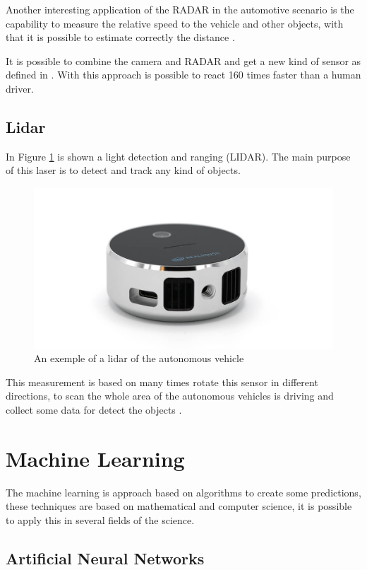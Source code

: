 Another interesting application of the RADAR in the automotive scenario is the capability to measure the relative speed to the vehicle and other objects, with that it is possible to estimate correctly the distance \cite{stevenson2011long}.

It is possible to combine the camera and RADAR and get a new kind of sensor as defined in \cite{kamerad}. With this approach is possible to react 160 times faster than a human driver.

\subsection{Lidar}
In Figure \ref{fig:lidar} is shown a light detection and ranging (LIDAR). The main purpose of this laser is to detect and track any kind of objects. 
\begin{figure}[H]
\centering
\includegraphics[width=\columnwidth]{imagens/lidar.jpg}
\caption{An exemple of a lidar of the autonomous vehicle}
\label{fig:lidar}
\end{figure}

This measurement is based on many times rotate this sensor in different directions, to scan the whole area of the autonomous vehicles is driving and collect some data for detect the objects \cite{gao2018object}.

\section{Machine Learning}\label{ml-ai}
The machine learning is approach based on algorithms to create some predictions, these techniques are based on mathematical and computer science, it is possible to apply this in several fields of the science. 
\subsection{Artificial Neural Networks}

